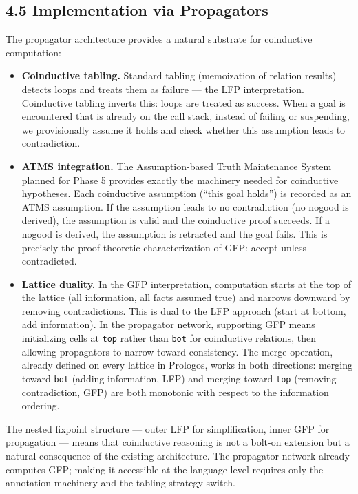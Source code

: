 \documentclass[11pt]{article}
\begin{document}
\subsection{4.5 Implementation via Propagators}
\label{sec:org5550f3b}

The propagator architecture provides a natural substrate for
coinductive computation:

\begin{itemize}
\item \textbf{Coinductive tabling.} Standard tabling (memoization of relation
results) detects loops and treats them as failure --- the LFP
interpretation. Coinductive tabling inverts this: loops are treated
as success. When a goal is encountered that is already on the call
stack, instead of failing or suspending, we provisionally assume it
holds and check whether this assumption leads to contradiction.

\item \textbf{ATMS integration.} The Assumption-based Truth Maintenance System
planned for Phase 5 provides exactly the machinery needed for
coinductive hypotheses. Each coinductive assumption (``this goal
holds'') is recorded as an ATMS assumption. If the assumption leads
to no contradiction (no nogood is derived), the assumption is valid
and the coinductive proof succeeds. If a nogood is derived, the
assumption is retracted and the goal fails. This is precisely the
proof-theoretic characterization of GFP: accept unless contradicted.

\item \textbf{Lattice duality.} In the GFP interpretation, computation starts at
the top of the lattice (all information, all facts assumed true) and
narrows downward by removing contradictions. This is dual to the LFP
approach (start at bottom, add information). In the propagator
network, supporting GFP means initializing cells at \texttt{top} rather
than \texttt{bot} for coinductive relations, then allowing propagators to
narrow toward consistency. The merge operation, already defined on
every lattice in Prologos, works in both directions: merging
toward \texttt{bot} (adding information, LFP) and merging toward \texttt{top}
(removing contradiction, GFP) are both monotonic with respect to the
information ordering.
\end{itemize}

The nested fixpoint structure --- outer LFP for simplification, inner
GFP for propagation --- means that coinductive reasoning is not a
bolt-on extension but a natural consequence of the existing
architecture. The propagator network already computes GFP; making it
accessible at the language level requires only the annotation
machinery and the tabling strategy switch.
\end{document}
